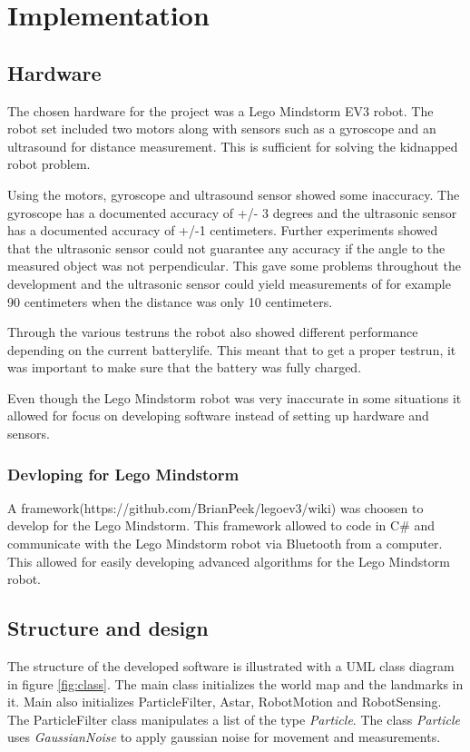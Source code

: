 \chapter{Implementation}
\label{chp:impl}
\section{Hardware}
The chosen hardware for the project was a Lego Mindstorm EV3 robot. The robot set included two motors along with sensors such as a gyroscope and an ultrasound for distance measurement. This is sufficient for solving the kidnapped robot problem.

Using the motors, gyroscope and ultrasound sensor showed some inaccuracy.  The gyroscope has a documented accuracy of +/- 3 degrees and the ultrasonic sensor has a documented accuracy of +/-1 centimeters. Further experiments showed that the ultrasonic sensor could not guarantee any accuracy if the angle to the measured object was not perpendicular. This gave some problems throughout the development and the ultrasonic sensor could yield measurements of for example 90 centimeters when the distance was only 10 centimeters. 

Through the various testruns the robot also showed different performance depending on the current batterylife. This meant that to get a proper testrun, it was important to make sure that the battery was fully charged. 

Even though the Lego Mindstorm robot was very inaccurate in some situations it allowed for focus on developing software instead of setting up hardware and sensors. 

\subsection{Devloping for Lego Mindstorm}
A framework(https://github.com/BrianPeek/legoev3/wiki) was choosen to develop for the Lego Mindstorm. This framework allowed to code in C\# and communicate with the Lego Mindstorm robot via Bluetooth from a computer. This allowed for easily developing advanced algorithms for the Lego Mindstorm robot.

\section{Structure and design}
The structure of the developed software is illustrated with a UML class diagram in figure \ref{fig:class}. The main class initializes the world map and the landmarks in it. Main also initializes ParticleFilter, Astar, RobotMotion and RobotSensing. The ParticleFilter class manipulates a list of the type \emph{Particle}. The class \emph{Particle} uses \emph{GaussianNoise} to apply gaussian noise for movement and measurements. 

